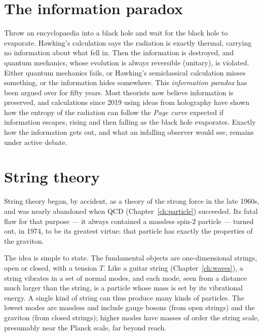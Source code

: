 \section{The information paradox}

Throw an encyclopaedia into a black hole and wait for the black hole to evaporate. Hawking's calculation says the radiation is exactly thermal, carrying no information about what fell in. Then the information is destroyed, and quantum mechanics, whose evolution is always reversible (unitary), is violated. Either quantum mechanics fails, or Hawking's semiclassical calculation misses something, or the information hides somewhere. This \emph{information paradox} has been argued over for fifty years. Most theorists now believe information is preserved, and calculations since 2019 using ideas from holography have shown how the entropy of the radiation can follow the \emph{Page curve} expected if information escapes, rising and then falling as the black hole evaporates. Exactly how the information gets out, and what an infalling observer would see, remains under active debate.

\section{String theory}

String theory began, by accident, as a theory of the strong force in the late 1960s, and was nearly abandoned when QCD (Chapter~\ref{ch:particle}) succeeded. Its fatal flaw for that purpose --- it always contained a massless spin-$2$ particle --- turned out, in 1974, to be its greatest virtue: that particle has exactly the properties of the graviton.

The idea is simple to state. The fundamental objects are one-dimensional strings, open or closed, with a tension $T$. Like a guitar string (Chapter~\ref{ch:waves}), a string vibrates in a set of normal modes, and each mode, seen from a distance much larger than the string, is a particle whose mass is set by its vibrational energy. A single kind of string can thus produce many kinds of particles. The lowest modes are massless and include gauge bosons (from open strings) and the graviton (from closed strings); higher modes have masses of order the string scale, presumably near the Planck scale, far beyond reach.

